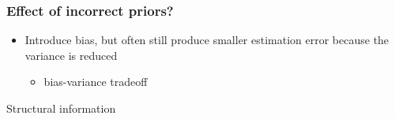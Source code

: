 \documentclass[10pt,handout]{beamer}
\begin{document}
\begin{frame}

  \frametitle{Effect of incorrect priors?}

  \begin{itemize}
  \item Introduce bias, but often still produce smaller estimation
    error because the variance is reduced
    \begin{itemize}
    \item bias-variance tradeoff
    \end{itemize}
  \end{itemize}

\end{frame}

\begin{frame}{Structural information }


\end{frame}
\end{document}
